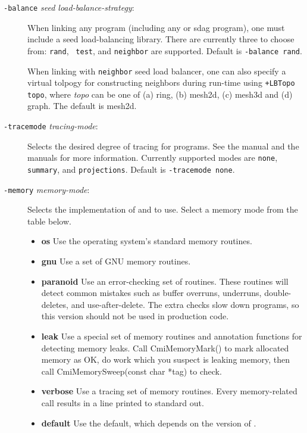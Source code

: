 \begin{description}
\item[{\tt -balance} {\em seed load-balance-strategy}:]

When linking any \converse{} program (including any \charmpp{} or sdag program),
one must include a seed load-balancing
library.  There are currently three to choose from: {\tt rand}, {\tt
test}, and {\tt neighbor} are supported.  Default is {\tt -balance rand}.

When linking with {\tt neighbor} seed load balancer, one can also specify
a virtual tolpogy for constructing neighbors during run-time using 
{\tt +LBTopo topo}, where {\em topo} can be one of (a) ring, (b) mesh2d,
(c) mesh3d and (d) graph. The default is mesh2d.

\item[{\tt -tracemode} {\em tracing-mode}:]

Selects the desired degree of tracing for \charmpp{} programs.
See the \charmpp{} manual and the \projections{} manuals for
more information.  Currently supported modes are {\tt none}, {\tt
summary}, and {\tt projections}. Default is {\tt -tracemode none}.


\item[{\tt -memory} {\em memory-mode}:]
Selects the implementation of  and 
to use.  Select a memory mode from the table below.

\begin{itemize}
\item{{\bf os} Use the operating system's standard memory routines.}
\item{{\bf gnu} Use a set of GNU memory routines.}
\item{{\bf paranoid} Use an error-checking set of routines.
These routines will detect common mistakes such as buffer
overruns, underruns, double-deletes, and use-after-delete.
The extra checks slow down programs, so this version should
not be used in production code.}
\item{{\bf leak} Use a special set of memory routines and
annotation functions for detecting memory leaks.
Call CmiMemoryMark() to mark allocated memory as OK,
do work which you suspect is leaking memory,
then call CmiMemorySweep(const char *tag) to check.}
\item{{\bf verbose} Use a tracing set of memory routines.
Every memory-related call results in a line printed to
standard out.}
\item{{\bf default} Use the default, which depends on the version of \charmpp.}
\end{itemize}



\end{description}
